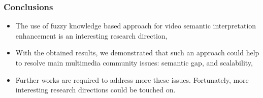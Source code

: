 \begin{frame}
	\frametitle{Conclusions}
	\begin{block}{}
	\begin{itemize}
		\item The use of fuzzy knowledge based approach for video semantic 
		interpretation enhancement is an interesting research direction,
		
		\item With the obtained results, we demonstrated that such an approach 
		could help to resolve main multimedia community issues: \alert{semantic gap}, 
		and \alert{scalability},
		
		\item Further works are required to address more these issues. 
		Fortunately, more interesting research directions could be touched on.
	\end{itemize}
	\end{block}
\end{frame}
